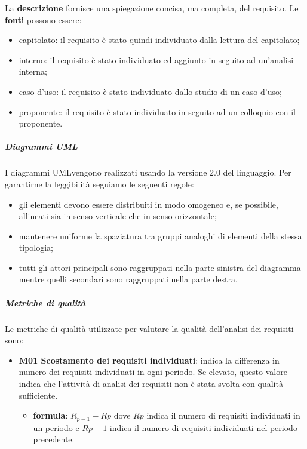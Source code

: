 		La \textbf{descrizione} fornisce una spiegazione concisa, ma completa, del requisito.
		Le \textbf{fonti} possono essere:
		\begin{itemize}
			\item capitolato\glo: il requisito è stato quindi individuato dalla lettura del capitolato\glo;
			\item interno: il requisito è stato individuato ed aggiunto in seguito ad un'analisi interna;
			\item caso d'uso\glo: il requisito è stato individuato dallo studio di un caso d'uso\glo;
			\item proponente: il requisito è stato individuato in seguito ad un colloquio con il proponente.
		\end{itemize}
		\subparagraph*{Diagrammi UML}
		I diagrammi UML\glosp vengono realizzati usando la versione 2.0 del linguaggio. Per garantirne la leggibilità seguiamo le seguenti regole:
		\begin{itemize}
			\item gli elementi devono essere distribuiti in modo omogeneo e, se possibile, allineati sia in senso verticale che in senso orizzontale;
			\item mantenere uniforme la spaziatura tra gruppi analoghi di elementi della stessa tipologia;
			\item tutti gli attori principali sono raggruppati nella parte sinistra del diagramma mentre quelli secondari sono raggruppati nella parte destra.
		\end{itemize}
		\subparagraph{Metriche di qualità} 
		Le metriche di qualità utilizzate per valutare la qualità dell'analisi dei requisiti sono:
		\begin{itemize}
			\item \textbf{M01 Scostamento dei requisiti individuati}: indica la differenza in numero dei requisiti individuati in ogni periodo. Se elevato, questo valore indica che l'attività di analisi dei requisiti non è stata svolta con qualità sufficiente.
			\begin{itemize}
				\item[] \textbf{formula}: $R_{p-1}-R{p}$ dove $R{p}$ indica il numero di requisiti individuati in un periodo e $R{p-1}$ indica il numero di requisiti individuati nel periodo precedente.
			\end{itemize} 
		\end{itemize}		
		\pagebreak
